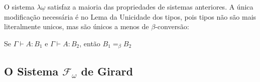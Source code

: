 \documentclass[../main.tex]{subfiles}
\begin{document}
O sistema $\lambda\underline{\omega}$ satisfaz a maioria das propriedades de sistemas anteriores. A única modificação necessária é no Lema da Unicidade dos tipos, pois tipos não são mais literalmente unicos, mas são únicos a menos de $\beta$-conversão:

\begin{lemma}
    Se $\Gamma \vdash A : B_1$ e $\Gamma \vdash A : B_2$, então $B_1 =_{\beta} B_2$
\end{lemma}

\subsection{O Sistema \texorpdfstring{$\mathcal{F}_{\omega}$}{Fw} de Girard}
\end{document}
